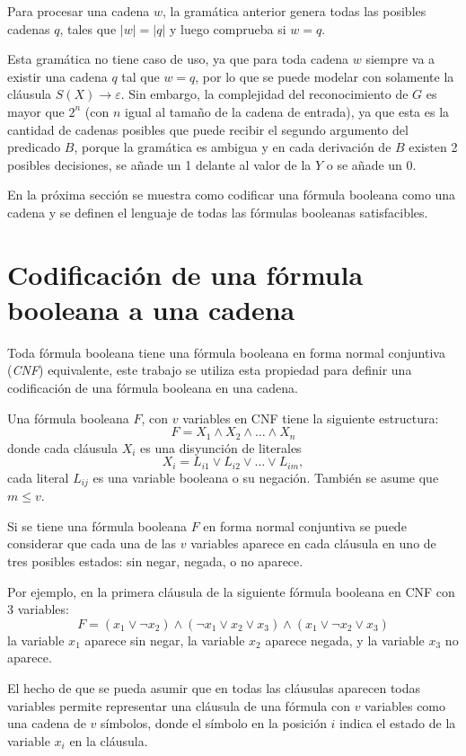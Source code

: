 \documentclass{article}
\begin{document}
Para procesar una cadena $w$, la gramática anterior genera todas las posibles cadenas $q$, tales que $|w|=|q|$ y luego comprueba si $w = q$.

Esta gramática no tiene caso de uso, ya que para toda cadena $w$ siempre va a existir una cadena $q$ tal que $w=q$,
por lo que se puede modelar con solamente la cláusula $S(X)\to \varepsilon$. Sin embargo, la complejidad del
reconocimiento de $G$ es mayor que $2^n$ (con $n$ igual al tamaño de la cadena de entrada), ya que esta es la
cantidad de cadenas posibles que puede recibir el segundo argumento del predicado $B$, porque la gramática es
ambigua y en cada derivación de $B$ existen 2 posibles decisiones, se añade un 1 delante al valor de la $Y$ o
se añade un $0$.

En la próxima sección se muestra como codificar una fórmula booleana como una cadena y se definen el lenguaje de todas las fórmulas booleanas satisfacibles.

\section{Codificación de una fórmula booleana a una cadena}
\label{sec:codsat}

Toda fórmula booleana tiene una fórmula booleana en forma normal conjuntiva (\textit{CNF}) equivalente, este trabajo se utiliza esta propiedad para definir
una codificación de una fórmula booleana en una cadena.

Una fórmula booleana $F$, con $v$ variables en CNF tiene la siguiente estructura:
$$F=X_1 \wedge X_2 \wedge \ldots \wedge X_n$$
donde cada cláusula $X_i$ es una disyunción de literales
$$X_i=L_{i1} \vee L_{i2} \vee \ldots \vee L_{im},$$
cada literal $L_{ij}$ es una variable booleana o su negación. También se asume que $m\leq v$.

Si se tiene una fórmula booleana $F$ en forma normal conjuntiva se puede considerar que cada una de las $v$ variables aparece en cada cláusula en uno de tres posibles estados: sin negar, negada, o no aparece.

Por ejemplo, en la primera cláusula de la siguiente fórmula booleana en CNF con 3 variables:
$$F=(x_1 \vee \neg x_2) \wedge (\neg x_1 \vee x_2 \vee x_3) \wedge (x_1 \vee \neg x_2 \vee x_3)$$
la variable $x_1$ aparece sin negar, la variable $x_2$ aparece negada, y la variable $x_{3}$ no aparece.

El hecho de que se pueda asumir que en todas las cláusulas aparecen todas variables permite representar una cláusula de una fórmula con $v$ variables como una cadena de $v$ símbolos, donde el símbolo en la posición $i$ indica el estado de la variable $x_i$ en la cláusula.
\end{document}
